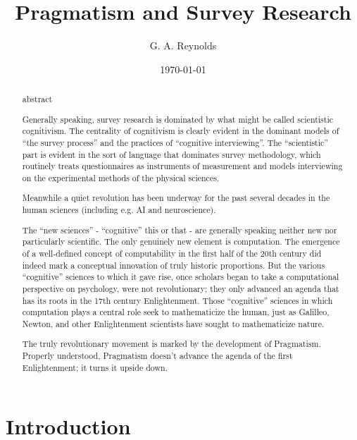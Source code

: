 \documentclass[11pt,twoside]{article}
\title{Pragmatism and Survey Research}
\author{G. A. Reynolds}
\date{\today}
\newcommand{\sr}{survey research}
\begin{document}
\maketitle
\nocite{*}

\begin{abstract}
abstract
\end{abstract}

\tableofcontents
\listoffigures

\newpage
\section{Introduction}

\begin{abstract}
Generally speaking, \sr{} is dominated by what might be called
scientistic cognitivism.  The centrality of cognitivism is clearly
evident in the dominant models of ``the survey process'' and the
practices of ``cognitive interviewing''.  The ``scientistic'' part is
evident in the sort of language that dominates survey methodology,
which routinely treats questionnaires as instruments of measurement
and models interviewing on the experimental methods of the physical
sciences.

Meanwhile a quiet revolution has been underway for the past several
decades in the human sciences (including e.g. AI and neuroscience).

The ``new sciences'' - ``cognitive'' this or that - are generally
speaking neither new nor particularly scientific.  The only genuinely
new element is computation.  The emergence of a well-defined concept
of computability in the first half of the 20th century did indeed mark
a conceptual innovation of truly historic proportions.  But the
various ``cognitive'' sciences to which it gave rise, once scholars
began to take a computational perspective on psychology, were not
revolutionary; they only advanced an agenda that has its roots in the
17th century Enlightenment.  Those ``cognitive'' sciences in which
computation plays a central role seek to mathematicize the human, just
as Galilleo, Newton, and other Enlightenment scientists have sought to
mathematicize nature.

The truly revolutionary movement is marked by the development of
Pragmatism.  Properly understood, Pragmatism doesn't advance the
agenda of the first Enlightenment; it turns it upside down.


\end{abstract}
\end{document}
